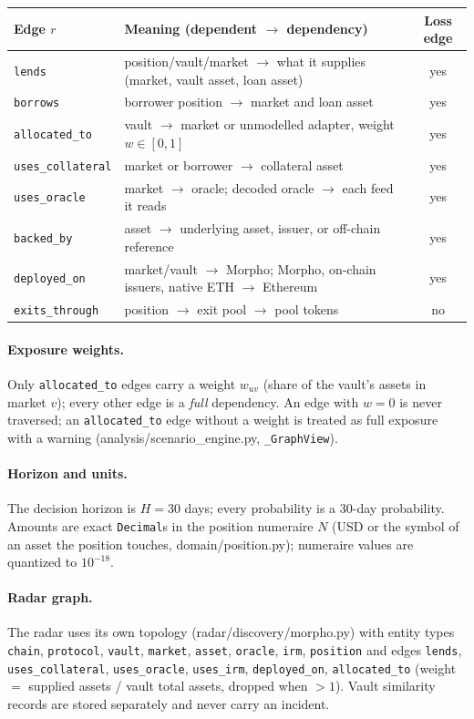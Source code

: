 \documentclass[11pt,a4paper]{article}
\newcommand{\code}[1]{\texttt{#1}}
\newcommand{\src}[1]{\textsf{\small #1}}
\begin{document}
\begin{center}\small
\begin{tabularx}{\textwidth}{@{}L{2.6cm}Yc@{}}
\toprule
Edge $r$ & Meaning (dependent $\to$ dependency) & Loss edge \\
\midrule
\code{lends} & position/vault/market $\to$ what it supplies (market, vault asset, loan asset) & yes \\
\code{borrows} & borrower position $\to$ market and loan asset & yes \\
\code{allocated\_to} & vault $\to$ market or unmodelled adapter, weight $w\in[0,1]$ & yes \\
\code{uses\_collateral} & market or borrower $\to$ collateral asset & yes \\
\code{uses\_oracle} & market $\to$ oracle; decoded oracle $\to$ each feed it reads & yes \\
\code{backed\_by} & asset $\to$ underlying asset, issuer, or off-chain reference & yes \\
\code{deployed\_on} & market/vault $\to$ Morpho; Morpho, on-chain issuers, native ETH $\to$ Ethereum & yes \\
\code{exits\_through} & position $\to$ exit pool $\to$ pool tokens & no \\
\bottomrule
\end{tabularx}
\end{center}

\paragraph{Exposure weights.} Only \code{allocated\_to} edges carry a weight
$w_{uv}$ (share of the vault's assets in market $v$); every other edge is a
\emph{full} dependency. An edge with $w=0$ is never traversed; an
\code{allocated\_to} edge without a weight is treated as full exposure with a
warning (\src{analysis/scenario\_engine.py}, \code{\_GraphView}).

\paragraph{Horizon and units.} The decision horizon is $H=30$ days; every
probability is a 30-day probability. Amounts are exact \code{Decimal}s in the
position numeraire $N$ (USD or the symbol of an asset the position touches,
\src{domain/position.py}); numeraire values are quantized to $10^{-18}$.

\paragraph{Radar graph.} The radar uses its own topology
(\src{radar/discovery/morpho.py}) with entity types \code{chain},
\code{protocol}, \code{vault}, \code{market}, \code{asset}, \code{oracle},
\code{irm}, \code{position} and edges \code{lends}, \code{uses\_collateral},
\code{uses\_oracle}, \code{uses\_irm}, \code{deployed\_on}, \code{allocated\_to}
(weight $=$ supplied assets / vault total assets, dropped when $>1$). Vault
similarity records are stored separately and never carry an incident.
\end{document}
